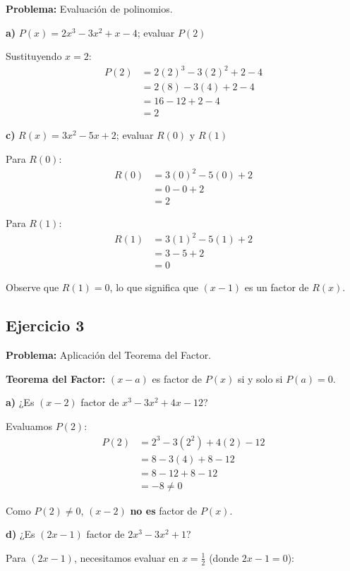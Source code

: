\textbf{Problema:} Evaluación de polinomios.

\textbf{a)} $P(x) = 2x^3 - 3x^2 + x - 4$; evaluar $P(2)$

Sustituyendo $x = 2$:
\begin{align}
P(2) &= 2(2)^3 - 3(2)^2 + 2 - 4\\
&= 2(8) - 3(4) + 2 - 4\\
&= 16 - 12 + 2 - 4\\
&= 2
\end{align}

\textbf{c)} $R(x) = 3x^2 - 5x + 2$; evaluar $R(0)$ y $R(1)$

Para $R(0)$:
\begin{align}
R(0) &= 3(0)^2 - 5(0) + 2\\
&= 0 - 0 + 2\\
&= 2
\end{align}

Para $R(1)$:
\begin{align}
R(1) &= 3(1)^2 - 5(1) + 2\\
&= 3 - 5 + 2\\
&= 0
\end{align}

Observe que $R(1) = 0$, lo que significa que $(x - 1)$ es un factor de $R(x)$.

\subsection*{Ejercicio 3}

\textbf{Problema:} Aplicación del Teorema del Factor.

\textbf{Teorema del Factor:} $(x - a)$ es factor de $P(x)$ si y solo si $P(a) = 0$.

\textbf{a)} ¿Es $(x - 2)$ factor de $x^3 - 3x^2 + 4x - 12$?

Evaluamos $P(2)$:
\begin{align}
P(2) &= 2^3 - 3(2^2) + 4(2) - 12\\
&= 8 - 3(4) + 8 - 12\\
&= 8 - 12 + 8 - 12\\
&= -8 \neq 0
\end{align}

Como $P(2) \neq 0$, $(x - 2)$ \textbf{no es} factor de $P(x)$.

\textbf{d)} ¿Es $(2x - 1)$ factor de $2x^3 - 3x^2 + 1$?

Para $(2x - 1)$, necesitamos evaluar en $x = \frac{1}{2}$ (donde $2x - 1 = 0$):

